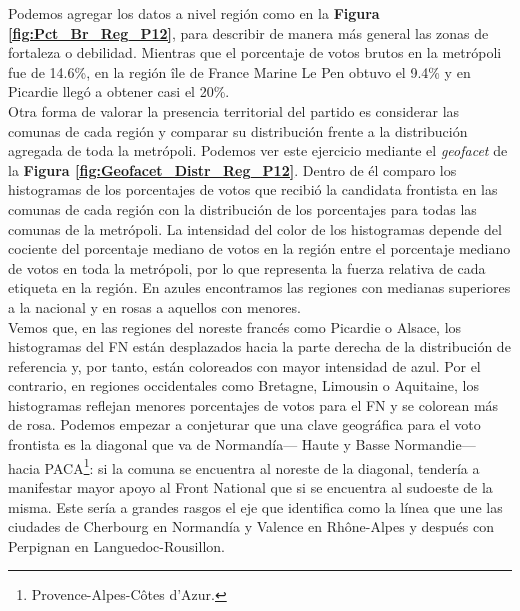 Podemos agregar los datos a nivel región como en la \textbf{Figura \ref{fig:Pct_Br_Reg_P12}}, para describir de manera más general las zonas de fortaleza o debilidad. Mientras que el porcentaje de votos brutos en la metrópoli fue de 14.6\%, en la región île de France Marine Le Pen obtuvo el 9.4\% y en Picardie llegó a obtener casi el 20\%.\\

Otra forma de valorar la presencia territorial del partido es considerar las comunas de cada región y comparar su distribución frente a la distribución agregada de toda la metrópoli. Podemos ver este ejercicio mediante el \textit{geofacet} de la \textbf{Figura \ref{fig:Geofacet_Distr_Reg_P12}}. Dentro de él comparo los histogramas de los porcentajes de votos que recibió la candidata frontista en las comunas de cada región con la distribución de los porcentajes para todas las comunas de la metrópoli. La intensidad del color de los histogramas depende del cociente del porcentaje mediano de votos en la región entre el porcentaje mediano de votos en toda la metrópoli, por lo que representa la fuerza relativa de cada etiqueta en la región. En azules encontramos las regiones con medianas superiores a la nacional y en rosas a aquellos con menores.\\

Vemos que, en las regiones del noreste francés como Picardie o Alsace, los histogramas del FN están desplazados hacia la parte derecha de la distribución de referencia y, por tanto, están coloreados con mayor intensidad de azul. Por el contrario, en regiones occidentales como Bretagne, Limousin o Aquitaine, los histogramas reflejan menores porcentajes de votos para el FN y se colorean más de rosa. Podemos empezar a conjeturar que una clave geográfica para el voto frontista es la diagonal que va de Normandía--- Haute y Basse Normandie--- hacia PACA\footnote{Provence-Alpes-Côtes d'Azur.}: si la comuna se encuentra al noreste de la diagonal, tendería a manifestar mayor apoyo al Front National que si se encuentra al sudoeste de la misma. Este sería a grandes rasgos el eje que \textcite{Goodliffe16} identifica como la línea que une las ciudades de Cherbourg en Normandía y Valence en Rhône-Alpes y después con Perpignan en Languedoc-Rousillon.\\ 

